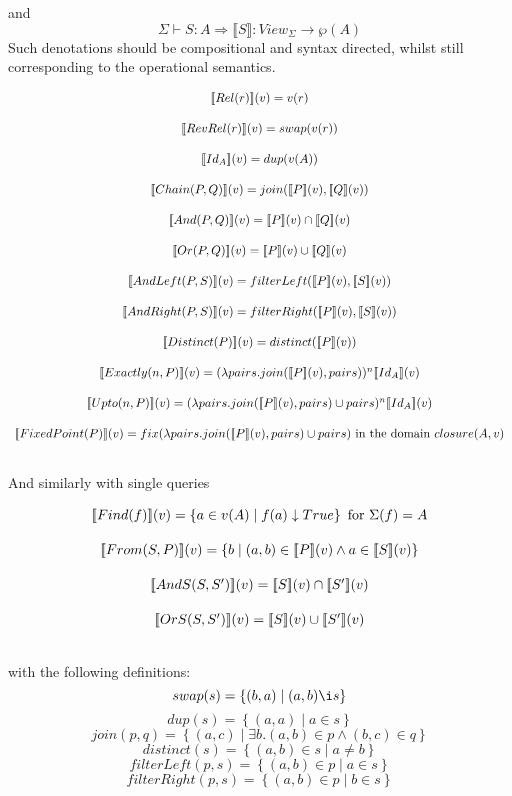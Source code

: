 \documentclass[12pt,a4paper,twoside,openright]{report}
\newcommand{\db}[1]{{\bf [\![}#1{\bf ]\!]}}
\newcommand{\deno}[1]{\db{#1}(v)}
\newcommand{\setComp}[2]{\left\lbrace #1 \mid #2 \right\rbrace}
\newcommand{\clos}[0]{closure(A, v)}
\begin{document}
and \[\Sigma \vdash S \colon A \Rightarrow\llbracket S \rrbracket \colon View_{\Sigma} \rightarrow \wp(A)\] Such denotations should be compositional and syntax directed, whilst still corresponding to the operational semantics.

\[ \begin{array}{c}
 \deno{Rel(r)} = v(r) \\[3ex]
 \deno{RevRel(r)} = swap(v(r)) \\[3ex]
 \deno{Id_A} = dup(v(A)) \\[3ex]
 \deno{Chain(P, Q)} = join(\deno{P}, \deno{Q}) \\[3ex]
 \deno{And(P, Q)} = \deno{P} \cap \deno{Q} \\[3ex]
 \deno{Or(P, Q)} = \deno{P} \cup \deno{Q} \\[3ex]
 \deno{AndLeft(P, S)} = filterLeft(\deno{P}, \deno{S}) \\[3ex]
 \deno{AndRight(P, S)} = filterRight(\deno{P}, \deno{S}) \\[3ex]
 \deno{Distinct(P)} = distinct(\deno{P}) \\[3ex]
 
 \deno{Exactly(n, P)} = (\lambda pairs. join(\deno{P}, pairs))^n \deno{Id_A} \\[3ex]
 \deno{Upto(n, P)} = (\lambda pairs. join(\deno{P}, pairs) \cup pairs)^n \deno{Id_A} \\[3ex]
 \deno{FixedPoint(P)} = fix (\lambda pairs. join(\deno{P}, pairs) \cup pairs)  \mbox{ in the domain $\clos$}\\[3ex]
\end{array} \]

And similarly with single queries

\[ \begin{array}{c}
\deno{Find(f)} = \setComp{a \in v(A)}{f(a)\downarrow True} \mbox{ for $\Sigma(f) = A$} \\[3ex]

\deno{From(S, P)} =  \setComp{b}{(a, b) \in \deno{P} \wedge a \in \deno{S}}   \\[3ex]

\deno{AndS(S, S')} = \deno{S} \cap \deno{S'} \\[3ex]

\deno{OrS(S, S')} = \deno{S} \cup \deno{S'} \\[3ex]

\end{array}\]

with the following definitions:
\[ swap(s) = \setComp{(b,a)}{(a, b) \i s}\]
\[ dup(s) = \setComp{(a,a)}{a \in s}\]
\[ join(p, q) = \setComp{(a, c)}{ \exists b. (a, b) \in p \wedge (b, c) \in q}\]
\[ distinct(s) = \setComp{(a, b) \in s} { a \neq b} \]
\[ filterLeft(p, s) = \setComp{(a, b) \in p}{a \in s}\]
\[ filterRight(p, s) = \setComp{(a, b) \in p}{b \in s}\]
    
\end{document}
